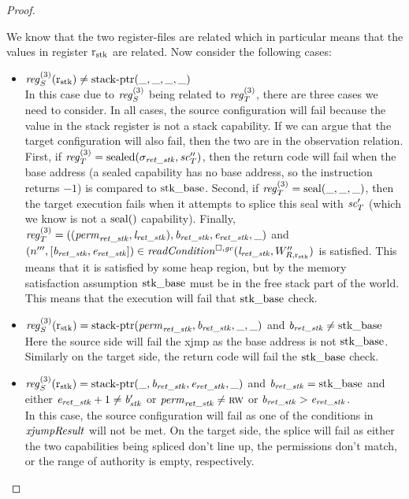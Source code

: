 \begin{proof}
\begin{description}
    We know that the two register-files are related which in particular means that the values in register $\mathrm{r}_\mathrm{stk}$ are related.
    Now consider the following cases: 
    \begin{itemize}
    \item $\reg_S^{(3)}(\rstk) \neq \stkptr{\_,\_,\_,\_}$\\
      In this case due to $\reg[3]_S$ being related to $\reg[3]_T$, there are three cases we need to consider.
      In all cases, the source configuration will fail because the value in the stack register is not a stack capability.
      If we can argue that the target configuration will also fail, then the two are in the observation relation.
      First, if $\reg[3]_T = \sealed{\sigma_\var{ret\_\stk},\vsc_T''}$, then the return code will fail when the base address (a sealed capability has no base address, so the instruction returns $-1$) is compared to $\mathrm{stk\_base}$.
      Second, if $\reg[3]_T = \seal{\_,\_,\_}$, then the target execution fails when it attempts to splice this seal with $\mathit{sc}_T'$ (which we know is not a $\mathrm{seal}()$ capability).
      Finally, $\reg[3]_T = ((\perm_\var{ret\_\stk},\lin_\var{ret\_\stk}),\baddr_\var{ret\_\stk},\eaddr_\var{ret\_\stk},\_)$ and $\npair[n''']{[\baddr_\var{ret\_\stk},\eaddr_\var{ret\_\stk}]} \in \readCond{\lin_\var{ret\_\stk},W_{R,\rstk}''}$ is satisfied.
      This means that it is satisfied by some heap region, but by the memory satisfaction assumption $\mathrm{stk\_base}$ must be in the free stack part of the world.
      This means that the execution will fail that $\mathrm{stk\_base}$ check.

    \item $\reg_S^{(3)}(\rstk) = \stkptr{\perm_\var{ret\_\stk},\baddr_\var{ret\_\stk},\_,\_}$ and $\mathit{b}_{\mathit{ret\_\mathit{stk}}} \neq \mathrm{stk\_base}$\\
      Here the source side will fail the xjmp as the base address is not $\mathrm{stk\_base}$.
      Similarly on the target side, the return code will fail the $\mathrm{stk\_base}$ check.

    \item $\reg_S^{(3)}(\rstk) = \stkptr{\_,\baddr_\var{ret\_\stk},\eaddr_\var{ret\_\stk},\_}$ and $\mathit{b}_{\mathit{ret\_\mathit{stk}}} = \mathrm{stk\_base}$ and either $\mathit{e}_{\mathit{ret\_\mathit{stk}}} +1 \neq \mathit{b}_{\mathit{stk}}' $ or $\mathit{perm}_{\mathit{ret\_\mathit{stk}}} \neq \textsc{rw}$ or
      $\mathit{b}_{\mathit{ret\_\mathit{stk}}} > \mathit{e}_{\mathit{ret\_\mathit{stk}}}$.\\
      In this case, the source configuration will fail as one of the conditions in $\mathit{xjumpResult}$ will not be met.
      On the target side, the splice will fail as either the two capabilities being spliced don't line up, the permissions don't match, or the range of authority is empty, respectively.


\end{itemize}
\end{description}
\end{proof}
